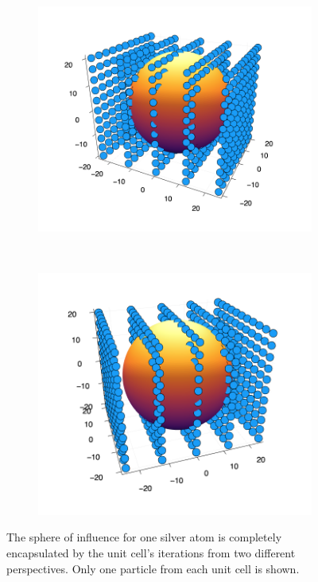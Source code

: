 \begin{figure}
  \begin{subfigure}{0.47\textwidth}
    \includegraphics[width=\linewidth]{Figures/iteratedUnitCell}
    \label{iteratedUnitCellFirst}
  \end{subfigure}%
  \\
  \begin{subfigure}{0.45\textwidth}
    \includegraphics[width=\linewidth]{Figures/iteratedUnitCell2}
    \label{iteratedUnitCellSecond}
  \end{subfigure}
\caption{The sphere of influence for one silver atom is completely encapsulated by the unit cell's iterations from two different perspectives. Only one particle from each unit cell is shown.} \label{iteratedUnitCells}
\end{figure}

